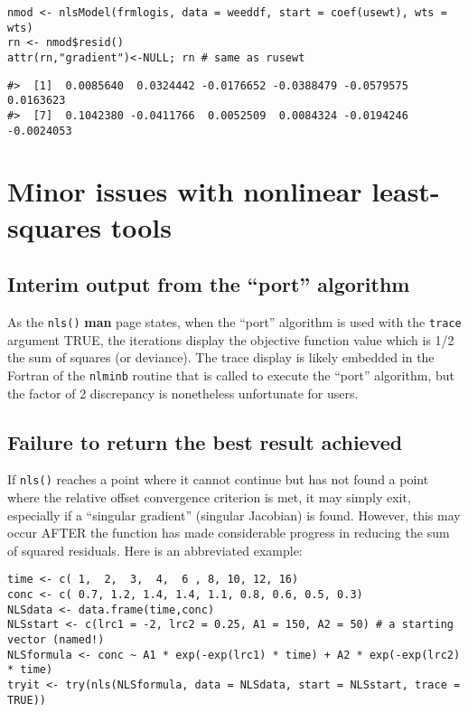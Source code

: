 \begin{verbatim}
nmod <- nlsModel(frmlogis, data = weeddf, start = coef(usewt), wts = wts)
rn <- nmod$resid()
attr(rn,"gradient")<-NULL; rn # same as rusewt
\end{verbatim}

\begin{verbatim}
#>  [1]  0.0085640  0.0324442 -0.0176652 -0.0388479 -0.0579575  0.0163623
#>  [7]  0.1042380 -0.0411766  0.0052509  0.0084324 -0.0194246 -0.0024053
\end{verbatim}

\hypertarget{minor-issues-with-nonlinear-least-squares-tools}{%
\section{Minor issues with nonlinear least-squares tools}\label{minor-issues-with-nonlinear-least-squares-tools}}

\hypertarget{interim-output-from-the-port-algorithm}{%
\subsection{Interim output from the ``port'' algorithm}\label{interim-output-from-the-port-algorithm}}

As the \texttt{nls()} \textbf{man} page states, when the ``port'' algorithm is used with the
\texttt{trace} argument TRUE, the iterations display the objective function value which
is 1/2 the sum of squares (or deviance). The trace display is likely
embedded in the Fortran of the \texttt{nlminb} routine that is called to execute
the ``port'' algorithm, but the factor of 2 discrepancy is nonetheless
unfortunate for users.

\hypertarget{failure-to-return-the-best-result-achieved}{%
\subsection{Failure to return the best result achieved}\label{failure-to-return-the-best-result-achieved}}

If \texttt{nls()} reaches a point where it cannot continue but has not found a point
where the relative offset convergence criterion is met, it may simply exit,
especially if a ``singular gradient'' (singular Jacobian) is found. However,
this may occur AFTER the function has made considerable progress in reducing
the sum of squared residuals.
Here is an abbreviated example:

\begin{verbatim}
time <- c( 1,  2,  3,  4,  6 , 8, 10, 12, 16)
conc <- c( 0.7, 1.2, 1.4, 1.4, 1.1, 0.8, 0.6, 0.5, 0.3)
NLSdata <- data.frame(time,conc)
NLSstart <- c(lrc1 = -2, lrc2 = 0.25, A1 = 150, A2 = 50) # a starting vector (named!)
NLSformula <- conc ~ A1 * exp(-exp(lrc1) * time) + A2 * exp(-exp(lrc2) * time)
tryit <- try(nls(NLSformula, data = NLSdata, start = NLSstart, trace = TRUE))
\end{verbatim}

